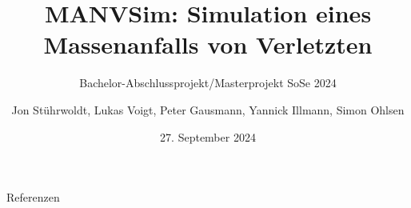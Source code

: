 \documentclass[10pt,aspectratio=169]{beamer}
\title[]{MANVSim: Simulation eines Massenanfalls von Verletzten}
\subtitle[]{Bachelor-Abschlussprojekt/Masterprojekt SoSe 2024}
\author{Jon Stührwoldt, Lukas Voigt, Peter Gausmann, Yannick Illmann, Simon Ohlsen}
\date{27. September 2024}
\begin{document}
\frame{\titlepage}







%
%

\begin{frame}{Referenzen}
	\printbibliography
\end{frame}
\end{document}
